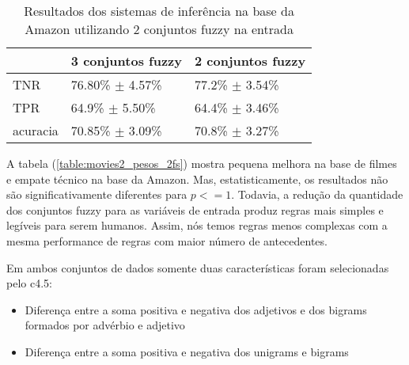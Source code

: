 \documentclass[template.tex]{subfiles}
\begin{document}
%
%
%

\begin{table}[!h]
    \begin{tabular}{lll}
    ~         			& 3 conjuntos fuzzy 							& 2 conjuntos fuzzy \\ \hline
    TNR 				& 76.80\% $\pm$ 4.57\%            	& 77.2\% $\pm$ 3.54\%    \\
    TPR    			& 64.9\% $\pm$ 5.50\% 					& 64.4\% $\pm$ 3.46\%   \\
    acuracia  		& 70.85\% $\pm$ 3.09\%         		& 70.8\% $\pm$ 3.27\%    \\
    \end{tabular}
    \caption{Resultados dos sistemas de inferência na base da Amazon utilizando 2 conjuntos fuzzy na entrada}
	\label{table:amazon2_pesos_2fs}
\end{table}

%
%
%

A tabela (\ref{table:movies2_pesos_2fs}) mostra pequena melhora na base de filmes e empate técnico na base da Amazon. Mas, estatisticamente, os resultados não são significativamente diferentes para $p <= 1$. Todavia, a redução da quantidade dos conjuntos fuzzy para as variáveis de entrada produz regras mais simples e legíveis para serem humanos. Assim, nós temos regras menos complexas com a mesma performance de regras com maior número de antecedentes. 

Em ambos conjuntos de dados somente duas características foram selecionadas pelo c4.5:
\begin{itemize}
\item Diferença entre a soma positiva e negativa dos adjetivos e dos bigrams formados por advérbio e adjetivo
\item Diferença entre a soma positiva e negativa dos unigrams e bigrams
\end{itemize}
\end{document}
